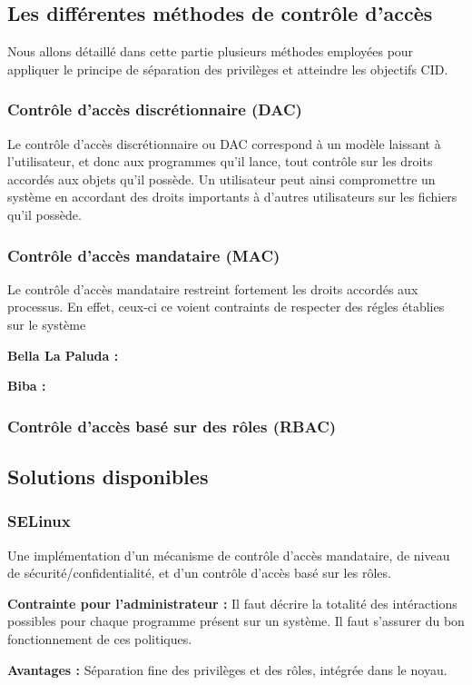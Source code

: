 \subsection{Les différentes méthodes de contrôle d'accès}

Nous allons détaillé dans cette partie plusieurs méthodes employées pour appliquer le principe de séparation des privilèges et atteindre les objectifs CID.

\subsubsection{Contrôle d'accès discrétionnaire (DAC)}

Le contrôle d'accès discrétionnaire ou DAC correspond à un modèle laissant à l'utilisateur, et donc aux programmes qu'il lance, tout contrôle sur les droits accordés aux objets qu'il possède. Un utilisateur peut ainsi compromettre un système en accordant des droits importants à d'autres utilisateurs sur les fichiers qu'il possède.

\subsubsection{Contrôle d'accès mandataire (MAC)}

Le contrôle d'accès mandataire restreint fortement les droits accordés aux processus. En effet, ceux-ci ce voient contraints de respecter des régles établies sur le système

\textbf{Bella La Paluda :}

\textbf{Biba :}

\subsubsection{Contrôle d'accès basé sur des rôles (RBAC)}

\subsection{Solutions disponibles}

\subsubsection{SELinux}

Une implémentation d'un mécanisme de contrôle d'accès mandataire, de niveau de sécurité/confidentialité, et d'un contrôle d'accès basé sur les rôles.

\begin{list}{}{}
 \item \textbf{Contrainte pour l'administrateur :} Il faut décrire la totalité des intéractions possibles pour chaque programme présent sur un système. Il faut s'assurer du bon fonctionnement de ces politiques.

 \item \textbf{Avantages :} Séparation fine des privilèges et des rôles, intégrée dans le noyau.
\end{list}



